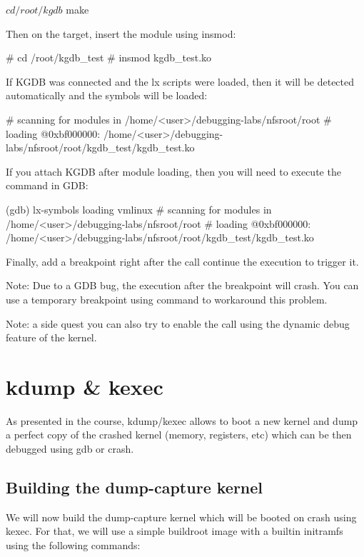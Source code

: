 \begin{bashinput}
$ cd /root/kgdb
$ make
\end{bashinput}

Then on the target, insert the module using insmod:
\begin{bashinput}
# cd /root/kgdb_test
# insmod kgdb_test.ko
\end{bashinput}

If KGDB was connected and the lx scripts were loaded, then it will be detected
automatically and the symbols will be loaded:

\begin{bashinput}
# scanning for modules in /home/<user>/debugging-labs/nfsroot/root
# loading @0xbf000000: /home/<user>/debugging-labs/nfsroot/root/kgdb_test/kgdb_test.ko
\end{bashinput}

If you attach KGDB after module loading, then you will need to execute the 
command in GDB:
\begin{bashinput}
(gdb) lx-symbols
loading vmlinux
# scanning for modules in /home/<user>/debugging-labs/nfsroot/root
# loading @0xbf000000: /home/<user>/debugging-labs/nfsroot/root/kgdb_test/kgdb_test.ko
\end{bashinput}

Finally, add a breakpoint right after the  call continue the
execution to trigger it.

Note: Due to a GDB bug, the execution after the breakpoint will crash. You can
use a temporary breakpoint using  command to workaround this
problem.

Note: a side quest you can also try to enable the  call using
the dynamic debug feature of the kernel.

\section{kdump \& kexec}

As presented in the course, kdump/kexec allows to boot a new kernel and dump a
perfect copy of the crashed kernel (memory, registers, etc) which can be then
debugged using gdb or crash. 

\subsection{Building the dump-capture kernel}

We will now build the dump-capture kernel which will be booted on crash using
kexec. For that, we will use a simple buildroot image with a builtin initramfs
using the following commands:

